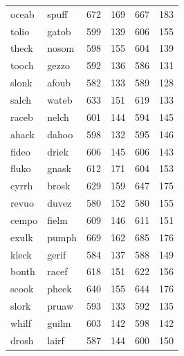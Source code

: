 \documentclass[
]{interact}
\begin{document}
\begin{longtable*}{llrrrr}
oceab & spuff & 672 & 169 & 667 & 183 \\ 
tolio & gatob & 599 & 139 & 606 & 155 \\ 
theck & nosom & 598 & 155 & 604 & 139 \\ 
tooch & gezzo & 592 & 136 & 586 & 131 \\ 
slonk & afoub & 582 & 133 & 589 & 128 \\ 
salch & wateb & 633 & 151 & 619 & 133 \\ 
raceb & nelch & 601 & 144 & 594 & 145 \\ 
ahack & dahoo & 598 & 132 & 595 & 146 \\ 
fideo & driek & 606 & 145 & 606 & 143 \\ 
fluko & gnask & 612 & 171 & 604 & 153 \\ 
cyrrh & brosk & 629 & 159 & 647 & 175 \\ 
revuo & duvez & 580 & 152 & 580 & 155 \\ 
cempo & fielm & 609 & 146 & 611 & 151 \\ 
exulk & pumph & 669 & 162 & 685 & 176 \\ 
kleck & gerif & 584 & 137 & 588 & 149 \\ 
bonth & racef & 618 & 151 & 622 & 156 \\ 
scook & pheek & 640 & 155 & 644 & 176 \\ 
slork & pruaw & 593 & 133 & 592 & 135 \\ 
whilf & guilm & 603 & 142 & 598 & 142 \\ 
drosh & lairf & 587 & 144 & 600 & 150 \\ 
\bottomrule
\end{longtable*}
\end{document}
